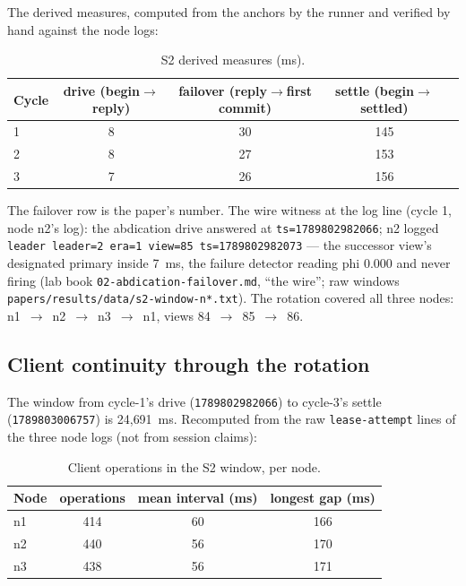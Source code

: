 \documentclass[10pt,journal,letterpaper]{IEEEtran}
\newcommand{\code}[1]{\texttt{\small #1}}
\newcommand{\ts}[1]{\code{#1}}
\begin{document}
The derived measures, computed from the anchors by the runner and
verified by hand against the node logs:

\begin{table}[h]
\centering
\caption{S2 derived measures (ms).}
\label{tab:derived}
\begin{tabular}{@{}lcccc@{}}
\toprule
Cycle & drive (begin$\to$reply) & failover (reply$\to$first commit) & settle (begin$\to$settled)\\
\midrule
1 & 8 & 30 & 145\\
2 & 8 & 27 & 153\\
3 & 7 & 26 & 156\\
\bottomrule
\end{tabular}
\end{table}

The failover row is the paper's number. The wire witness at the log
line (cycle 1, node n2's log): the abdication drive answered at
\ts{ts=1789802982066}; n2 logged
\code{leader leader=2 era=1 view=85 ts=1789802982073} --- the successor
view's designated primary inside 7~ms, the failure detector reading
phi 0.000 and never firing (lab book \code{02-abdication-failover.md},
``the wire''; raw windows \code{papers/results/data/s2-window-n*.txt}).
The rotation covered all three nodes:
n1~$\to$~n2~$\to$~n3~$\to$~n1, views 84~$\to$~85~$\to$~86.

\subsection{Client continuity through the rotation}

The window from cycle-1's drive (\ts{1789802982066}) to cycle-3's
settle (\ts{1789803006757}) is 24{,}691~ms. Recomputed from the raw
\code{lease-attempt} lines of the three node logs (not from session
claims):

\begin{table}[h]
\centering
\caption{Client operations in the S2 window, per node.}
\label{tab:continuity}
\begin{tabular}{@{}lccc@{}}
\toprule
Node & operations & mean interval (ms) & longest gap (ms)\\
\midrule
n1 & 414 & 60 & 166\\
n2 & 440 & 56 & 170\\
n3 & 438 & 56 & 171\\
\bottomrule
\end{tabular}
\end{table}
\end{document}
